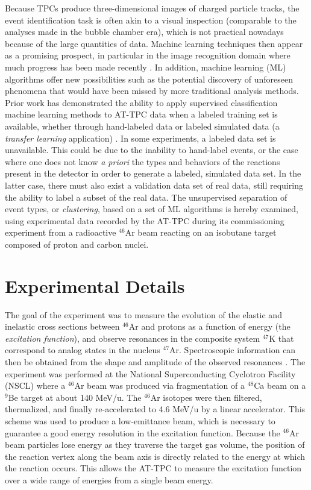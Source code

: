 \documentclass[review,number,sort&compress]{elsarticle}
\begin{document}
Because TPCs produce three-dimensional images of charged particle tracks, the event identification task is often akin to a visual inspection (comparable to the analyses made in the bubble chamber era), which is not practical nowadays because of the large quantities of data. Machine learning techniques then appear as a promising prospect, in particular in the image recognition domain where much progress has been made recently \cite{mehta2019}. In addition, machine learning (ML) algorithms offer new possibilities such as the potential discovery of unforeseen phenomena that would have been missed by more traditional analysis methods. Prior work has demonstrated the ability to apply supervised classification machine learning methods to AT-TPC data when a labeled training set is available, whether through hand-labeled data or labeled simulated data (a {\em transfer learning} application) \cite{Kuchera2019}. In some experiments, a labeled data set is unavailable. This could be  due to the inability to hand-label events, or the case where one does not know {\em a priori} the types and behaviors of the reactions present in the detector in order to generate a labeled, simulated data set. In the latter case, there must also exist a validation data set of real data, still requiring the ability to label a subset of the real data. The unsupervised separation of event types, or {\em clustering}, based on a set of ML algorithms is hereby examined, using experimental data recorded by the AT-TPC during its commissioning experiment from a radioactive $^{46}$Ar beam reacting on an isobutane target composed of proton and carbon nuclei. 

\section{Experimental Details} 
\label{Sec:Exp}
The goal of the experiment was to measure the evolution of the elastic and inelastic cross sections between $^{46}$Ar and protons as a function of energy (the {\em excitation function}), and observe resonances in the composite system $^{47}$K that correspond to analog states in the nucleus $^{47}$Ar. Spectroscopic information can then be obtained from the shape and amplitude of the observed resonances \cite{Bradt2018}. 
The experiment was performed at the National Superconducting Cyclotron Facility (NSCL) where a $^{46}$Ar beam was produced via fragmentation of a $^{48}$Ca beam on a $^9$Be target at about 140 MeV/u. The $^{46}$Ar isotopes were then filtered, thermalized, and finally re-accelerated to 4.6 MeV/u by a linear accelerator. This scheme was used to produce a low-emittance beam, which is necessary to guarantee a good energy resolution in the excitation function. Because the  $^{46}$Ar beam particles lose energy as they traverse the target gas volume, the position of the reaction vertex along the beam axis is directly related to the energy at which the reaction occurs. This allows the AT-TPC to measure the excitation function over a wide range of energies from a single beam energy.
\end{document}
